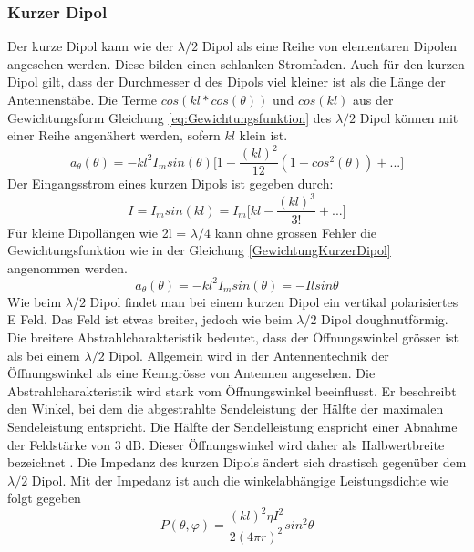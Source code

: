 \newpage
\subsubsection{Kurzer Dipol }\label{sec:kurzerDipol}
Der kurze Dipol kann wie der $\lambda /2$ Dipol als eine Reihe von elementaren Dipolen angesehen werden. Diese bilden einen schlanken Stromfaden. Auch für den kurzen Dipol gilt, dass der Durchmesser d des Dipols viel kleiner ist als die Länge der Antennenstäbe. 
Die Terme $cos(kl*cos(\theta)) $ und $cos(kl)$ aus der Gewichtungsform Gleichung \ref{eq:Gewichtungsfunktion}
 des $\lambda/2$ Dipol können mit einer Reihe angenähert werden, sofern $kl$ klein ist.
\begin{equation}
a_{\theta}(\theta)=-kl^{2}I_{m}sin(\theta) \biggl\lbrack 1- \frac{(kl)^{2}}{12}(1+cos^{2}(\theta))+...\biggr\rbrack
\end{equation}
Der Eingangsstrom eines kurzen Dipols ist gegeben durch:
\begin{equation}
I=I_{m}sin(kl)=I_{m}\biggl\lbrack kl - \frac{(kl)^{3}}{3!} +... \biggr\rbrack
\end{equation}
 Für kleine Dipollängen wie 2l = $\lambda/4 $ kann ohne grossen Fehler die Gewichtungsfunktion wie in der Gleichung \ref{GewichtungKurzerDipol}  angenommen werden.
\begin{equation}\label{GewichtungKurzerDipol}
a_{\theta}(\theta)=-kl^{2}I_{m}sin(\theta)=-Ilsin\theta
\end{equation}
Wie beim $\lambda/2$ Dipol findet man bei einem kurzen Dipol ein vertikal polarisiertes E Feld. Das Feld ist etwas breiter, jedoch wie beim $\lambda/2$ Dipol doughnutförmig. Die breitere Abstrahlcharakteristik  bedeutet, dass der Öffnungswinkel grösser ist als bei einem $\lambda/2$ Dipol. Allgemein wird in der Antennentechnik  der Öffnungswinkel als eine Kenngrösse von Antennen angesehen. Die Abstrahlcharakteristik wird stark vom Öffnungswinkel beeinflusst. Er beschreibt  den Winkel, bei dem die abgestrahlte Sendeleistung der Hälfte der maximalen Sendeleistung entspricht. Die Hälfte der Sendelleistung enspricht   einer Abnahme der Feldstärke von 3 dB. Dieser Öffnungswinkel wird  daher als Halbwertbreite bezeichnet \cite{Oeffnungswinkel}.  Die Impedanz des kurzen Dipols ändert sich  drastisch gegenüber dem $\lambda/2$ Dipol. Mit der Impedanz ist auch die winkelabhängige Leistungsdichte wie folgt gegeben\cite{elliott1981antenna}
\begin{equation}
P(\theta,\varphi)=\frac{(kl)^{2}\eta I^{2}}{2(4\pi r)^{2}}sin^{2}\theta
\end{equation}
